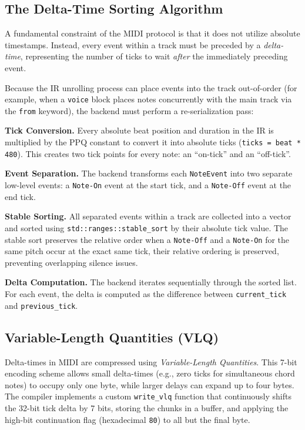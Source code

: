 \subsection{The Delta-Time Sorting Algorithm}\label{detail-subsec:the-delta-time-sorting-algorithm}

A fundamental constraint of the MIDI protocol is that it does not utilize absolute timestamps.
Instead, every event within a track must be preceded by a \textit{delta-time}, representing the number of ticks to wait
\textit{after} the immediately preceding event.

Because the IR unrolling process can place events into the track out-of-order (for example, when a \texttt{voice} block
places notes concurrently with the main track via the \texttt{from} keyword), the backend must perform a
re-serialization pass:

\noindent \textbf{Tick Conversion.} Every absolute beat position and duration in the IR is multiplied by the
PPQ constant
to convert it into absolute ticks (\texttt{ticks = beat * 480}).
This creates two tick points for every note: an ``on-tick'' and an ``off-tick''.

\noindent \textbf{Event Separation.} The backend transforms each \texttt{NoteEvent} into two separate
low-level events: a
\texttt{Note-On} event at the start tick, and a \texttt{Note-Off} event at the end tick.

\noindent \textbf{Stable Sorting.} All separated events within a track are collected into a vector and sorted using
\texttt{std::ranges::stable\_sort} by their absolute tick value.
The stable sort preserves the relative order when a \texttt{Note-Off} and a \texttt{Note-On} for the same
pitch occur at the exact
same tick, their relative ordering is preserved, preventing overlapping silence issues.

\noindent \textbf{Delta Computation.} The backend iterates sequentially through the sorted list.
For each event, the delta is computed as the difference between \texttt{current\_tick} and
\texttt{previous\_tick}.

\subsection{Variable-Length Quantities (VLQ)}\label{detail-subsec:variable-length-quantities-(vlq)}

Delta-times in MIDI are compressed using \textit{Variable-Length Quantities}.
This 7-bit encoding scheme allows small delta-times (e.g., zero ticks for simultaneous chord notes) to occupy only one
byte, while larger delays can expand up to four bytes.
The compiler implements a custom \texttt{write\_vlq} function that continuously shifts the 32-bit tick delta by 7 bits,
storing the chunks in a buffer, and applying the high-bit continuation flag (hexadecimal \texttt{80}) to all but the
final byte.

